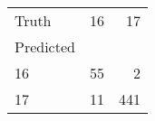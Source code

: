 \begin{tabular}{lrr}
\toprule
Truth & 16 & 17 \\
Predicted &  &  \\
\midrule
16 & 55 & 2 \\
17 & 11 & 441 \\
\bottomrule
\end{tabular}
